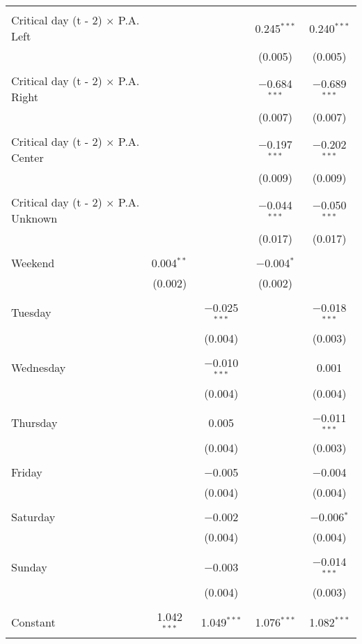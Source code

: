 \documentclass[
]{article}
\begin{document}
\begin{table}[!htbp]
{\begin{tabular}{@{\extracolsep{5pt}}lcccc}
  & & & & \\ 
 Critical day (t - 2) $\times$ P.A. Left &  &  & 0.245$^{***}$ & 0.240$^{***}$ \\ 
  &  &  & (0.005) & (0.005) \\ 
  & & & & \\ 
 Critical day (t - 2) $\times$ P.A. Right &  &  & $-$0.684$^{***}$ & $-$0.689$^{***}$ \\ 
  &  &  & (0.007) & (0.007) \\ 
  & & & & \\ 
 Critical day (t - 2) $\times$ P.A. Center &  &  & $-$0.197$^{***}$ & $-$0.202$^{***}$ \\ 
  &  &  & (0.009) & (0.009) \\ 
  & & & & \\ 
 Critical day (t - 2) $\times$ P.A. Unknown &  &  & $-$0.044$^{***}$ & $-$0.050$^{***}$ \\ 
  &  &  & (0.017) & (0.017) \\ 
  & & & & \\ 
 Weekend & 0.004$^{**}$ &  & $-$0.004$^{*}$ &  \\ 
  & (0.002) &  & (0.002) &  \\ 
  & & & & \\ 
 Tuesday &  & $-$0.025$^{***}$ &  & $-$0.018$^{***}$ \\ 
  &  & (0.004) &  & (0.003) \\ 
  & & & & \\ 
 Wednesday &  & $-$0.010$^{***}$ &  & 0.001 \\ 
  &  & (0.004) &  & (0.004) \\ 
  & & & & \\ 
 Thursday &  & 0.005 &  & $-$0.011$^{***}$ \\ 
  &  & (0.004) &  & (0.003) \\ 
  & & & & \\ 
 Friday &  & $-$0.005 &  & $-$0.004 \\ 
  &  & (0.004) &  & (0.004) \\ 
  & & & & \\ 
 Saturday &  & $-$0.002 &  & $-$0.006$^{*}$ \\ 
  &  & (0.004) &  & (0.004) \\ 
  & & & & \\ 
 Sunday &  & $-$0.003 &  & $-$0.014$^{***}$ \\ 
  &  & (0.004) &  & (0.003) \\ 
  & & & & \\ 
 Constant & 1.042$^{***}$ & 1.049$^{***}$ & 1.076$^{***}$ & 1.082$^{***}$ \\ 

\end{tabular}}
\end{table}
\end{document}
